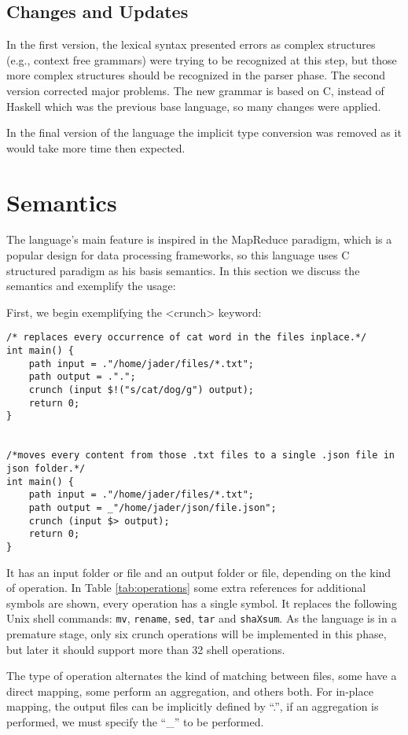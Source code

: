 \documentclass{article}
\begin{document}
\subsection{Changes and Updates}
In the first version, the lexical syntax presented errors as complex structures
(e.g., context free grammars) were trying to be recognized at this step, but
those more complex structures should be recognized in the parser phase. The
second version corrected major problems. The new grammar is based on C, instead
of Haskell which was the previous base language, so many changes were applied.

In the final version of the language the implicit type conversion was removed
as it would take more time then expected.

\section{Semantics}
\label{sec:semantics}
The language's main feature is inspired in the MapReduce paradigm, which is a
popular design for data processing frameworks, so this language uses C
structured paradigm as his basis semantics. In this section we discuss the
semantics and exemplify the usage:

First, we begin exemplifying the <crunch> keyword:

\begin{verbatim}
/* replaces every occurrence of cat word in the files inplace.*/
int main() {
    path input = ."/home/jader/files/*.txt";
    path output = .".";
    crunch (input $!("s/cat/dog/g") output);
    return 0;
}


/*moves every content from those .txt files to a single .json file in json folder.*/
int main() {
    path input = ."/home/jader/files/*.txt";
    path output = _"/home/jader/json/file.json";
    crunch (input $> output);
    return 0;
}
\end{verbatim}

It has an input folder or file and an output folder or file, depending on the
kind of operation.  In Table \ref{tab:operations} some extra references for
additional symbols are shown, every operation has a single symbol. It replaces
the following Unix shell commands: \texttt{mv}, \texttt{rename}, \texttt{sed},
\texttt{tar} and \texttt{shaXsum}. As the language is in a premature stage,
only six crunch operations will be implemented in this phase, but later it
should support more than 32 shell operations.

The type of operation alternates the kind of matching between files, some have
a direct mapping, some perform an aggregation, and others both. For in-place
mapping, the output files can be implicitly defined by ``.'', if an aggregation
is performed, we must specify the  ``\_'' to be performed.
\end{document}
